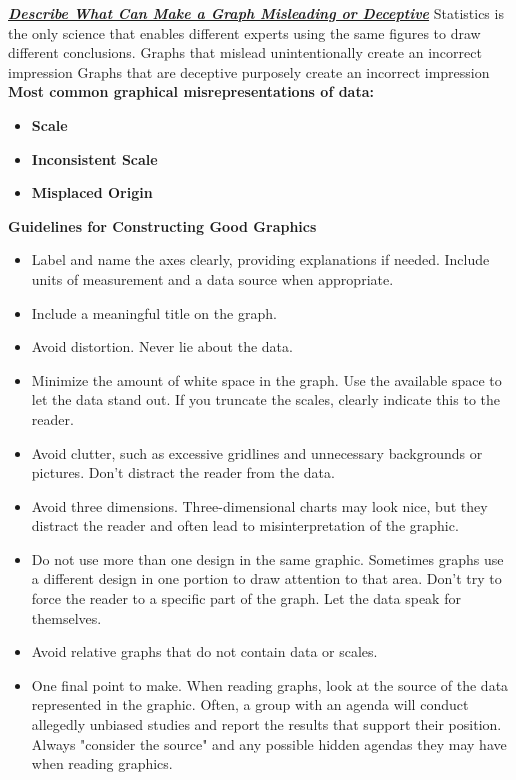 \documentclass{report}
\begin{document}
        \bigbreak \noindent 
        \textbf{\textit{\underline{Describe What Can Make a Graph Misleading or Deceptive}}}
        \bigbreak \noindent 
        Statistics is the only science that enables different experts using the same figures to draw different conclusions.
        \bigbreak \noindent 
        Graphs that mislead unintentionally create an incorrect impression
        \bigbreak \noindent 
        Graphs that are deceptive purposely create an incorrect impression
        \bigbreak \noindent 
        \textbf{Most common graphical misrepresentations of data:}
        \begin{itemize}
            \item \textbf{Scale}
            \item \textbf{Inconsistent Scale}
            \item \textbf{Misplaced Origin}
        \end{itemize}
        \textbf{Guidelines for Constructing Good Graphics}
        \begin{itemize}
            \item Label and name the axes clearly, providing explanations if needed. Include units of measurement and a data source when appropriate.
            \item Include a meaningful title on the graph.
            \item Avoid distortion. Never lie about the data.
            \item Minimize the amount of white space in the graph. Use the available space to let the data stand out. If you truncate the scales, clearly indicate this to the reader.
            \item Avoid clutter, such as excessive gridlines and unnecessary backgrounds or pictures. Don't distract the reader from the data.
            \item Avoid three dimensions. Three-dimensional charts may look nice, but they distract the reader and often lead to misinterpretation of the graphic.
            \item Do not use more than one design in the same graphic. Sometimes graphs use a different design in one portion to draw attention to that area. Don't try to force the reader to a specific part of the graph. Let the data speak for themselves.
            \item Avoid relative graphs that do not contain data or scales.
            \item One final point to make. When reading graphs, look at the source of the data represented in the graphic. Often, a group with an agenda will conduct allegedly unbiased studies and report the results that support their position. Always "consider the source" and any possible hidden agendas they may have when reading graphics.
        \end{itemize}
\end{document}
